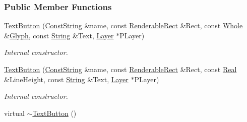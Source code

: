\subsubsection*{Public Member Functions}
\begin{DoxyCompactItemize}
\item 
\hyperlink{classMezzanine_1_1UI_1_1TextButton_af4fe4056a7c4c2714638165a24b5a706}{TextButton} (\hyperlink{namespaceMezzanine_a63cd699ac54b73953f35ec9cfc05e506}{ConstString} \&name, const \hyperlink{structMezzanine_1_1UI_1_1RenderableRect}{RenderableRect} \&Rect, const \hyperlink{namespaceMezzanine_adcbb6ce6d1eb4379d109e51171e2e493}{Whole} \&\hyperlink{classMezzanine_1_1UI_1_1Glyph}{Glyph}, const \hyperlink{namespaceMezzanine_acf9fcc130e6ebf08e3d8491aebcf1c86}{String} \&Text, \hyperlink{classMezzanine_1_1UI_1_1Layer}{Layer} $\ast$PLayer)
\begin{DoxyCompactList}\small\item\em Internal constructor. \item\end{DoxyCompactList}\item 
\hyperlink{classMezzanine_1_1UI_1_1TextButton_afe8633509682d805d21b388bb25441b9}{TextButton} (\hyperlink{namespaceMezzanine_a63cd699ac54b73953f35ec9cfc05e506}{ConstString} \&name, const \hyperlink{structMezzanine_1_1UI_1_1RenderableRect}{RenderableRect} \&Rect, const \hyperlink{namespaceMezzanine_a726731b1a7df72bf3583e4a97282c6f6}{Real} \&LineHeight, const \hyperlink{namespaceMezzanine_acf9fcc130e6ebf08e3d8491aebcf1c86}{String} \&Text, \hyperlink{classMezzanine_1_1UI_1_1Layer}{Layer} $\ast$PLayer)
\begin{DoxyCompactList}\small\item\em Internal constructor. \item\end{DoxyCompactList}\item 
\hypertarget{classMezzanine_1_1UI_1_1TextButton_a25c5727451d8dac8919c098b030c5bb8}{
virtual \hyperlink{classMezzanine_1_1UI_1_1TextButton_a25c5727451d8dac8919c098b030c5bb8}{$\sim$TextButton} ()}
\label{classMezzanine_1_1UI_1_1TextButton_a25c5727451d8dac8919c098b030c5bb8}


\end{DoxyCompactItemize}

